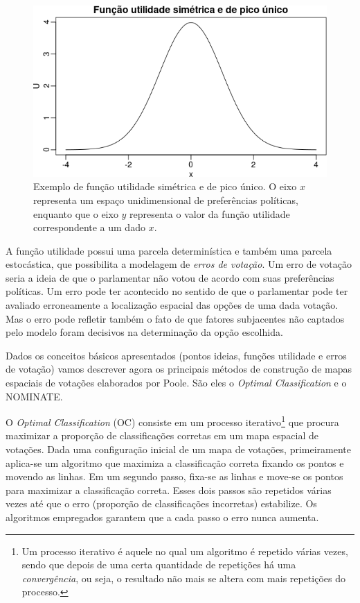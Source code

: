 \documentclass[a4paper, 12pt]{article}
\begin{document}
\begin{figure}[h!]
  \centering
  \includegraphics[scale=0.6]{figs/funcao_utilidade.png}
  \caption{Exemplo de função utilidade simétrica e de pico único. O eixo $x$ representa um espaço unidimensional de preferências políticas, enquanto que o eixo $y$ representa o valor da função utilidade correspondente a um dado $x$.}
  \label{fig:funcao_utilidade}
\end{figure}

A função utilidade possui uma parcela determinística e também uma parcela estocástica, que possibilita a modelagem de \emph{erros de votação}. Um erro de votação seria a ideia de que o parlamentar não votou de acordo com suas preferências políticas. Um erro pode ter acontecido no sentido de que o parlamentar pode ter avaliado erroneamente a localização espacial das opções de uma dada votação. Mas o erro pode refletir também o fato de que fatores subjacentes não captados pelo modelo foram decisivos na determinação da opção escolhida.

Dados os conceitos básicos apresentados (pontos ideias, funções utilidade e erros de votação) vamos descrever agora os principais métodos de construção de mapas espaciais de votações elaborados por Poole. São eles o \emph{Optimal Classification} e o NOMINATE.

O \emph{Optimal Classification} (OC) consiste em um processo iterativo\footnote{Um processo iterativo é aquele no qual um algoritmo é repetido várias vezes, sendo que depois de uma certa quantidade de repetições há uma \emph{convergência}, ou seja, o resultado não mais se altera com mais repetições do processo.} que procura maximizar a proporção de classificações corretas em um mapa espacial de votações. Dada uma configuração inicial de um mapa de votações, primeiramente aplica-se um algoritmo que maximiza a classificação correta fixando os pontos e movendo as linhas. Em um segundo passo, fixa-se as linhas e move-se os pontos para maximizar a classificação correta. Esses dois passos são repetidos várias vezes até que o erro (proporção de classificações incorretas) estabilize. Os algoritmos empregados garantem que a cada passo o erro nunca aumenta. 
\end{document}
